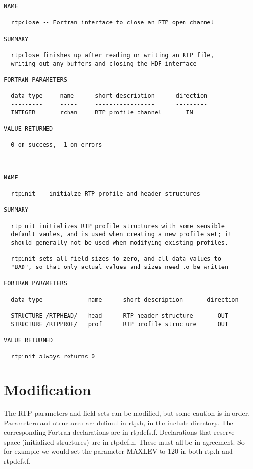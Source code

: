 \documentclass[11pt]{article}
\begin{document}
\newpage
{\footnotesize
\begin{verbatim}
NAME    

  rtpclose -- Fortran interface to close an RTP open channel

SUMMARY

  rtpclose finishes up after reading or writing an RTP file, 
  writing out any buffers and closing the HDF interface

FORTRAN PARAMETERS

  data type     name      short description      direction
  ---------     -----     -----------------      ---------
  INTEGER       rchan     RTP profile channel       IN

VALUE RETURNED

  0 on success, -1 on errors



NAME    

  rtpinit -- initialze RTP profile and header structures

SUMMARY

  rtpinit initializes RTP profile structures with some sensible
  default vaules, and is used when creating a new profile set; it
  should generally not be used when modifying existing profiles.

  rtpinit sets all field sizes to zero, and all data values to
  "BAD", so that only actual values and sizes need to be written

FORTRAN PARAMETERS

  data type             name      short description       direction
  ---------             -----     -----------------       ---------
  STRUCTURE /RTPHEAD/   head      RTP header structure       OUT
  STRUCTURE /RTPPROF/   prof      RTP profile structure      OUT

VALUE RETURNED

  rtpinit always returns 0

\end{verbatim}
}

\section{Modification}

The RTP parameters and field sets can be modified, but some caution
is in order.  Parameters and structures are defined in rtp.h, in the
include directory.  The corresponding Fortran declarations are in
rtpdefs.f.  Declarations that reserve space (initialized structures)
are in rtpdef.h.  These must all be in agreement.  So for example we
would set the parameter MAXLEV to 120 in both rtp.h and rtpdefs.f.
\end{document}
